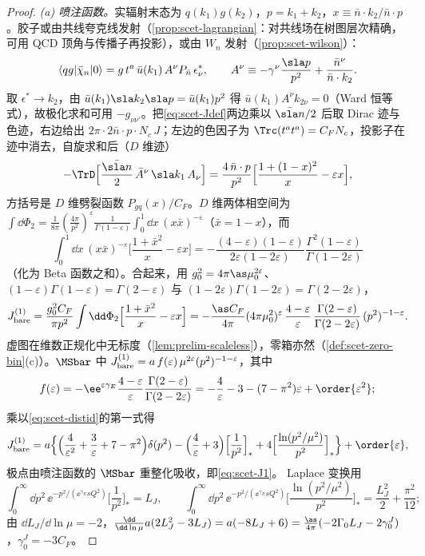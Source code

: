 \begin{proof}
\emph{(a) 喷注函数。}实辐射末态为 $q(k_1)g(k_2)$，$p=k_1+k_2$，$x\equiv\bar n\cdot k_2/\bar n\cdot p$。胶子或由共线夸克线发射（\cref{prop:scet-lagrangian}：对共线场在树图层次精确，可用 QCD 顶角与传播子再投影），或由 $W_n$ 发射（\cref{prop:scet-wilson}）：
\[
\langle qg|\bar\chi_n|0\rangle=g\,t^a\,\bar u(k_1)\,A^\nu P_{\bar n}\,\epsilon^*_\nu,\qquad A^\nu\equiv-\gamma^\nu\frac{\sla p}{p^2}+\frac{\bar n^\nu}{\bar n\cdot k_2}.
\]
取 $\epsilon^*\to k_2$，由 $\bar u(k_1)\sla k_2\sla p=\bar u(k_1)p^2$ 得 $\bar u(k_1)A^\nu k_{2\nu}=0$（Ward 恒等式），故极化求和可用 $-g_{\nu\nu'}$。把\cref{eq:scet-Jdef}两边乘以 $\bar{\sla n}/2$ 后取 Dirac 迹与色迹，右边给出 $2\pi\cdot2\bar n\cdot p\cdot N_c\,J$；左边的色因子为 $\Trc(t^at^a)=C_FN_c$，投影子在迹中消去，自旋求和后（$D$ 维迹）
\[
-\TrD\Big[\frac{\bar{\sla n}}{2}\,\bar A^\nu\,\sla k_1\,A_\nu\Big]=\frac{4\,\bar n\cdot p}{p^2}\Big[\frac{1+(1-x)^2}{x}-\varepsilon x\Big],
\]
方括号是 $D$ 维劈裂函数 $P_{gq}(x)/C_F$。$D$ 维两体相空间为 $\int\dd\Phi_2=\frac{1}{8\pi}(\frac{4\pi}{p^2})^\varepsilon\frac{1}{\Gamma(1-\varepsilon)}\int_0^1\dd x\,(x\bar x)^{-\varepsilon}$（$\bar x=1-x$），而
\[
\int_0^1\dd x\,(x\bar x)^{-\varepsilon}\Big[\frac{1+\bar x^2}{x}-\varepsilon x\Big]=-\frac{(4-\varepsilon)(1-\varepsilon)}{2\varepsilon(1-2\varepsilon)}\frac{\Gamma^2(1-\varepsilon)}{\Gamma(1-2\varepsilon)}
\]
（化为 Beta 函数之和）。合起来，用 $g_0^2=4\pi\as\mu_0^{2\varepsilon}$、$(1-\varepsilon)\Gamma(1-\varepsilon)=\Gamma(2-\varepsilon)$ 与 $(1-2\varepsilon)\Gamma(1-2\varepsilon)=\Gamma(2-2\varepsilon)$，
\[
J^{(1)}_{\rm bare}=\frac{g_0^2C_F}{\pi p^2}\int\dd\Phi_2\Big[\frac{1+\bar x^2}{x}-\varepsilon x\Big]
=-\frac{\as C_F}{4\pi}(4\pi\mu_0^2)^\varepsilon\,\frac{4-\varepsilon}{\varepsilon}\,\frac{\Gamma(2-\varepsilon)}{\Gamma(2-2\varepsilon)}\,(p^2)^{-1-\varepsilon}.
\]
虚图在维数正规化中无标度（\cref{lem:prelim-scaleless}），零箱亦然（\cref{def:scet-zero-bin}(c)）。$\MSbar$ 中 $J^{(1)}_{\rm bare}=a\,f(\varepsilon)\,\mu^{2\varepsilon}(p^2)^{-1-\varepsilon}$，其中
\[
f(\varepsilon)=-\ee^{\varepsilon\gamma_E}\frac{4-\varepsilon}{\varepsilon}\frac{\Gamma(2-\varepsilon)}{\Gamma(2-2\varepsilon)}=-\frac4\varepsilon-3-(7-\pi^2)\varepsilon+\order{\varepsilon^2};
\]
乘以\cref{eq:scet-distid}的第一式得
\[
J^{(1)}_{\rm bare}=a\Big\{\Big(\frac4{\varepsilon^2}+\frac3\varepsilon+7-\pi^2\Big)\delta(p^2)-\Big(\frac4\varepsilon+3\Big)\Big[\frac1{p^2}\Big]_*+4\Big[\frac{\ln(p^2/\mu^2)}{p^2}\Big]_*\Big\}+\order{\varepsilon},
\]
极点由喷注函数的 $\MSbar$ 重整化吸收，即\cref{eq:scet-J1}。%
Laplace 变换用
\[
\int_0^\infty\dd p^2\,\ee^{-p^2/(\ee^{\gamma_E}sQ^2)}\Big[\frac1{p^2}\Big]_*=L_J,\qquad
\int_0^\infty\dd p^2\,\ee^{-p^2/(\ee^{\gamma_E}sQ^2)}\Big[\frac{\ln(p^2/\mu^2)}{p^2}\Big]_*=\frac{L_J^2}{2}+\frac{\pi^2}{12};
\]
由 $\dd L_J/\dd\ln\mu=-2$，$\frac{\dd}{\dd\ln\mu}a(2L_J^2-3L_J)=a(-8L_J+6)=\frac{\as}{4\pi}(-2\Gamma_0L_J-2\gamma^J_0)$，$\gamma^J_0=-3C_F$。


\end{proof}
